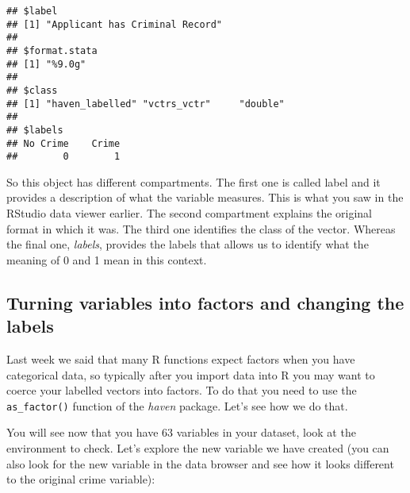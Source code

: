 \documentclass[
]{book}
\newenvironment{Shaded}{\begin{snugshade}}{\end{snugshade}}
\newcommand{\CommentTok}[1]{\textcolor[rgb]{0.56,0.35,0.01}{\textit{#1}}}
\newcommand{\FunctionTok}[1]{\textcolor[rgb]{0.13,0.29,0.53}{\textbf{#1}}}
\newcommand{\NormalTok}[1]{#1}
\newcommand{\OtherTok}[1]{\textcolor[rgb]{0.56,0.35,0.01}{#1}}
\newcommand{\SpecialCharTok}[1]{\textcolor[rgb]{0.81,0.36,0.00}{\textbf{#1}}}
\begin{document}
\begin{verbatim}
## $label
## [1] "Applicant has Criminal Record"
## 
## $format.stata
## [1] "%9.0g"
## 
## $class
## [1] "haven_labelled" "vctrs_vctr"     "double"        
## 
## $labels
## No Crime    Crime 
##        0        1
\end{verbatim}

So this object has different compartments. The first one is called label and it provides a description of what the variable measures. This is what you saw in the RStudio data viewer earlier. The second compartment explains the original format in which it was. The third one identifies the class of the vector. Whereas the final one, \emph{labels}, provides the labels that allows us to identify what the meaning of 0 and 1 mean in this context.

\subsection{Turning variables into factors and changing the labels}\label{turning-variables-into-factors-and-changing-the-labels}

Last week we said that many R functions expect factors when you have categorical data, so typically after you import data into R you may want to coerce your labelled vectors into factors. To do that you need to use the \texttt{as\_factor()} function of the \emph{haven} package. Let's see how we do that.

\begin{Shaded}
\end{Shaded}

You will see now that you have 63 variables in your dataset, look at the environment to check. Let's explore the new variable we have created (you can also look for the new variable in the data browser and see how it looks different to the original crime variable):
\end{document}
